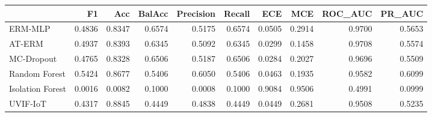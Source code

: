\begin{tabular}{lrrrrrrrrr}
\toprule
 & F1 & Acc & BalAcc & Precision & Recall & ECE & MCE & ROC_AUC & PR_AUC \\
\midrule
ERM-MLP & 0.4836 & 0.8347 & 0.6574 & 0.5175 & 0.6574 & 0.0505 & 0.2914 & 0.9700 & 0.5653 \\
AT-ERM & 0.4937 & 0.8393 & 0.6345 & 0.5092 & 0.6345 & 0.0299 & 0.1458 & 0.9708 & 0.5574 \\
MC-Dropout & 0.4765 & 0.8328 & 0.6506 & 0.5187 & 0.6506 & 0.0284 & 0.2027 & 0.9696 & 0.5509 \\
Random Forest & 0.5424 & 0.8677 & 0.5406 & 0.6050 & 0.5406 & 0.0463 & 0.1935 & 0.9582 & 0.6099 \\
Isolation Forest & 0.0016 & 0.0082 & 0.1000 & 0.0008 & 0.1000 & 0.9084 & 0.9506 & 0.4991 & 0.0999 \\
UVIF-IoT & 0.4317 & 0.8845 & 0.4449 & 0.4838 & 0.4449 & 0.0449 & 0.2681 & 0.9508 & 0.5235 \\
\bottomrule
\end{tabular}
